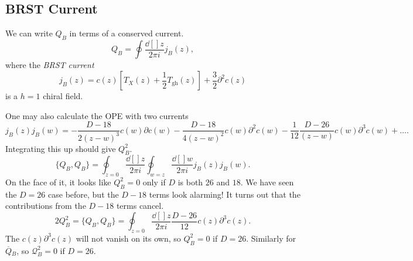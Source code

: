 \subsection*{BRST Current}%

We can write $Q_B$ in terms of a conserved current.
\begin{equation}
  Q_B = \oint \frac{\dd[]{z}}{2 \pi i} j_B (z),
\end{equation}
where the \emph{BRST current}
\begin{equation}
  j_B(z) = c(z) \left[ T_X(z) + \frac{1}{2} T_{\text{gh}}(z) \right] + \frac{3}{2} \partial^2 c(z)
\end{equation}
is a $h = 1$ chiral field.

One may also calculate the OPE with two currents
\begin{equation}
  j_B(z) j_B(w) = -\frac{D - 18}{2 (z - w)^3} c(w) \partial c(w) - \frac{D- 18}{4 (z - w)^2} c(w) \partial^2 c(w) - \frac{1}{12} \frac{D - 26}{(z - w)} c(w) \partial^3 c(w) + \dots.
\end{equation}
Integrating this up should give $Q_B^2$.
\begin{equation}
  \{Q_B, Q_B\} = \oint_{z = 0} \frac{\dd[]{z}}{2 \pi i} \oint_{w = z} \frac{\dd[]{w}}{2 \pi i} j_B(z) j_B(w).
\end{equation}
On the face of it, it looks like $Q_B^2 = 0$ only if $D$ is both $26$ and $18$.
We have seen the $D = 26$ case before, but the $D-18$ terms look alarming!
It turns out that the contributions from the $D-18$ terms cancel.
\begin{equation}
  2 Q_B^2 = \{Q_B, Q_B\} = \oint_{z = 0} \frac{\dd[]{z}}{2 \pi i} \frac{D - 26}{12} c(z) \partial^3 c(z).
\end{equation}
The $c(z) \partial^3 c(z)$ will not vanish on its own, so $Q_B^2 = 0$ if $D = 26$.
Similarly for $\overline{Q}{}_B$, so $\mathcal{Q}_B^2 = 0$ if $D = 26$.

